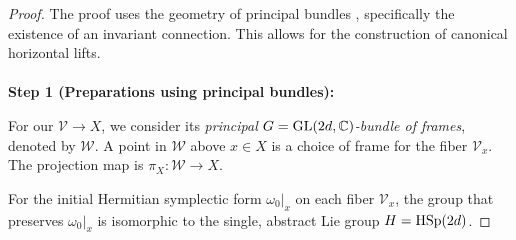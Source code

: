 \documentclass[11pt]{amsart}
\theoremstyle{remark}
\theoremstyle{definition}
\newcommand{\GL}{{\rm GL}}
\newcommand{\HSp}{{\rm HSp}}
\begin{document}
\begin{proof}
The proof uses the geometry of principal bundles \cite{SS}, specifically the existence of an invariant connection. This allows for the construction of canonical horizontal lifts. 
\\
\\
\textbf{Step 1 (Preparations using principal bundles): }

For our $\mathcal{V} \to X$, 
we consider its \textit{principal} $G=\GL(2d, \mathbb{C})$\textit{-bundle of frames}, denoted by $\mathcal{W}$. A point in $\mathcal{W}$ above $x \in X$ is a choice of frame for the fiber $\mathcal{V}_x$. The projection map is $\pi_X: \mathcal{W} \to X$.

For the initial Hermitian symplectic form $\omega_0|_x$ on each fiber $\mathcal{V}_x$, 
the group that preserves $\omega_0|_x$ is isomorphic to the single, abstract Lie group $H=\HSp(2d)$. 


\end{proof}
\end{document}
